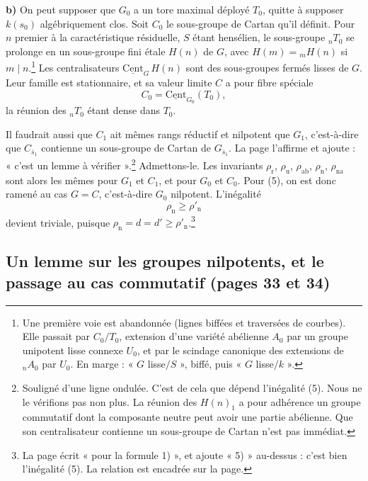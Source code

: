 \documentclass[11pt,a4paper]{article}
\begin{document}
\textbf{b)} On peut supposer que $G_{0}$ a un tore maximal déployé $T_{0}$,
quitte à supposer $k(s_{0})$ algébriquement clos. Soit
$C_{0}$ le sous-groupe de Cartan qu'il définit. Pour $n$ premier à la
caractéristique résiduelle, $S$ étant hensélien, le sous-groupe
${}_{n}T_{0}$ se prolonge en un sous-groupe fini étale $H(n)$ de $G$, avec
$H(m) = {}_{m}H(n)$ si $m \mid n$.\footnote{Une première voie est abandonnée
(lignes biffées et traversées de courbes). Elle passait par $C_{0}/T_{0}$,
extension d'une variété abélienne $A_{0}$ par un groupe unipotent lisse
connexe $U_{0}$, et par le scindage canonique des extensions de
${}_{n}A_{0}$ par $U_{0}$. En marge : « $G$ lisse$/S$ », biffé, puis « $G$
lisse$/k$ ».}
Les centralisateurs $\underline{\mathrm{Cent}}_{G}\, H(n)$ sont des
sous-groupes fermés lisses de $G$. Leur famille est stationnaire, et sa
valeur limite $C$ a pour fibre spéciale
\[
  C_{0} = \underline{\mathrm{Cent}}_{G_{0}}(T_{0}) ,
\]
la réunion des ${}_{n}T_{0}$ étant dense dans $T_{0}$.

Il faudrait aussi que $C_{1}$ ait mêmes rangs réductif et nilpotent que
$G_{1}$, c'est-à-dire que $C_{\bar s_{1}}$ contienne un sous-groupe de Cartan
de $G_{\bar s_{1}}$. La page l'affirme et ajoute : « c'est un lemme à
vérifier ».\footnote{Souligné d'une ligne ondulée. C'est de cela que dépend
l'inégalité (5). Nous ne le vérifions pas non plus. La réunion des
$H(n)_{1}$ a pour adhérence un groupe commutatif dont la composante neutre
peut avoir une partie abélienne. Que son centralisateur contienne un
sous-groupe de Cartan n'est pas immédiat.} Admettons-le. Les invariants
$\rho_{\mathrm{r}}$, $\rho_{\mathrm{u}}$, $\rho_{\mathrm{ab}}$,
$\rho_{\mathrm{n}}$, $\rho_{\mathrm{na}}$ sont alors les mêmes pour $G_{1}$ et
$C_{1}$, et pour $G_{0}$ et $C_{0}$. Pour (5), on est donc ramené au cas
$G = C$, c'est-à-dire $G_{0}$ nilpotent. L'inégalité
\[
  \rho_{\mathrm{n}} \geqslant \rho'_{\mathrm{n}}
\]
devient triviale, puisque $\rho_{\mathrm{n}} = d = d' \geqslant
\rho'_{\mathrm{n}}$.\footnote{La page écrit « pour la formule 1) », et ajoute
« 5) » au-dessus : c'est bien l'inégalité (5). La relation est encadrée sur
la page.}

\subsection*{Un lemme sur les groupes nilpotents, et le passage au cas commutatif (pages 33 et 34)}
\end{document}

